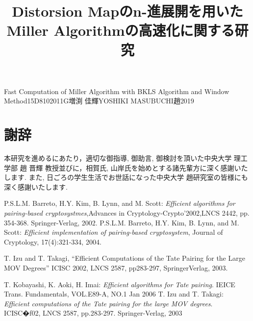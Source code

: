 \documentclass[a4j,oneside,openany]{jsbook}
\begin{document}

\title{Distorsion Mapのn-進展開を用いた　Miller Algorithmの高速化に関する研究}{Fast Computation of Miller Algorithm with BKLS Algorithm and Window Method}{15D8102011G}{増渕 佳輝}{YOSHIKI MASUBUCHI}{趙}{2019}

\setcounter{page}{1}


\newpage

\tableofcontents
\newpage











\chapter*{謝辞}
本研究を進めるにあたり，適切な御指導, 御助言, 御検討を頂いた中央大学 理工学部 趙 晋輝 教授並びに，相賀氏, 山岸氏を始めとする諸先輩方に深く感謝いたします. また, 日ごろの学生生活でお世話になった中央大学 趙研究室の皆様にも深く感謝いたします.


\begin{thebibliography}{99}
	 P.S.L.M. Barreto, H.Y. Kim, B. Lynn, and M. Scott: {\em Efficient algorithms for pairing-based cryptosystmes},Advances in Cryptology-Crypto'2002,LNCS 2442, pp. 354-368. Springer-Verlag, 2002.
	 P.S.L.M. Barreto, H.Y. Kim, B. Lynn, and M. Scott: {\em Efficient implementation of pairing-based cryptosystem}, Journal of Cryptology, 17(4):321-334, 2004.

   T. Izu and T. Takagi, “Efficient Computations of the Tate Pairing for the Large MOV Degrees” ICISC 2002, LNCS 2587, pp283-297, SpringerVerlag, 2003.


	 T. Kobayashi, K. Aoki, H. Imai: {\em Efficient algorithms for Tate pairing}. IEICE Trans. Fundamentals, VOL.E89-A, NO.1 Jan 2006
	 T. Izu and T. Takagi: {\em Efficient computations of the Tate pairing for the large MOV degrees}. ICISC�f02, LNCS 2587, pp.283-297. Springer-Verlag, 2003

\end{thebibliography}
\end{document}

